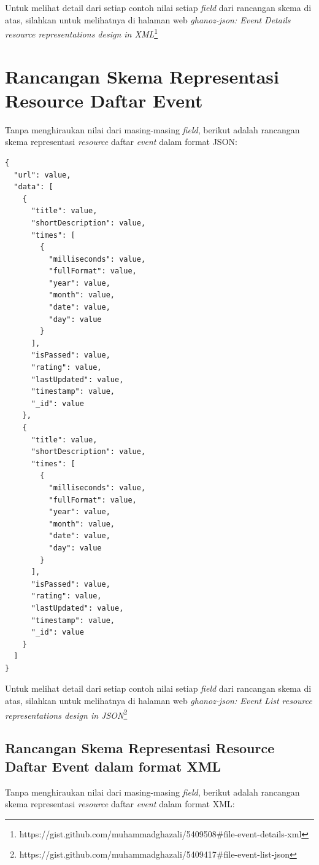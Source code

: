 \documentclass[a4paper, 12pt, oneside]{report}
\begin{document}
\onehalfspacing Untuk melihat detail dari setiap contoh nilai setiap \textit{field} dari rancangan skema di atas, silahkan untuk melihatnya di halaman web \textit{ghanoz-json: Event Details resource representations design in XML}\footnote{https://gist.github.com/muhammadghazali/5409508\#file-event-details-xml}

\section{Rancangan Skema Representasi Resource Daftar Event}

\onehalfspacing Tanpa menghiraukan nilai dari masing-masing \textit{field}, berikut adalah rancangan skema representasi \textit{resource} daftar \textit{event} dalam format JSON:

\begin{lstlisting}[frame=single]
{
  "url": value,
  "data": [
    {
      "title": value,
      "shortDescription": value,
      "times": [
        {
          "milliseconds": value,
          "fullFormat": value,
          "year": value,
          "month": value,
          "date": value,
          "day": value
        }
      ],
      "isPassed": value,
      "rating": value,
      "lastUpdated": value,
      "timestamp": value,
      "_id": value
    },
    {
      "title": value,
      "shortDescription": value,
      "times": [
        {
          "milliseconds": value,
          "fullFormat": value,
          "year": value,
          "month": value,
          "date": value,
          "day": value
        }
      ],
      "isPassed": value,
      "rating": value,
      "lastUpdated": value,
      "timestamp": value,
      "_id": value
    }
  ]
}
\end{lstlisting}

\onehalfspacing Untuk melihat detail dari setiap contoh nilai setiap \textit{field} dari rancangan skema di atas, silahkan untuk melihatnya di halaman web \textit{ghanoz-json: Event List resource representations design in JSON}\footnote{https://gist.github.com/muhammadghazali/5409417\#file-event-list-json}

\subsection{Rancangan Skema Representasi Resource Daftar Event dalam format XML}
\onehalfspacing Tanpa menghiraukan nilai dari masing-masing \textit{field}, berikut adalah rancangan skema representasi \textit{resource} daftar \textit{event} dalam format XML:
\end{document}
